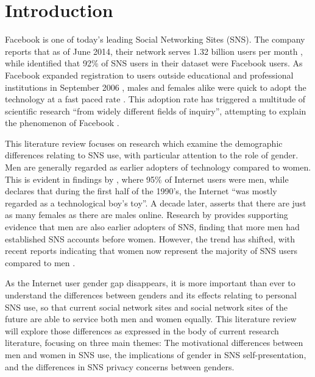 \section{Introduction}

Facebook is one of today's leading Social Networking Sites (SNS). The company reports that as of June 2014, their network serves 1.32 billion users per month \citep{Facebook2014}, while \citet{Hampton2011} identified that 92\% of SNS users in their dataset were Facebook users. As Facebook expanded registration to users outside educational and professional institutions in September 2006 \citep{Facebook2014}, males and females alike were quick to adopt the technology at a fast paced rate \citep{Mazman2011}. This adoption rate has triggered a multitude of scientific research ``from widely different fields of inquiry'', attempting to explain the phenomenon of Facebook \citep[p. 983]{Caers2013}. 

This literature review focuses on research which examine the demographic differences relating to SNS use, with particular attention to the role of gender. Men are generally regarded as earlier adopters of technology compared to women. This is evident in findings by \citet{Pitkow1994}, where 95\% of Internet users were men, while \citet[p. 896]{Kimbrough2013} declares that during the first half of the 1990's, the Internet ``was mostly regarded as a technological boy's toy''. A decade later, \citet{Fallows2005} asserts that there are just as many females as there are males online. Research by \citet{Fogel2009} provides supporting evidence that men are also earlier adopters of SNS, finding that more men had established SNS accounts before women. However, the trend has shifted, with recent reports indicating that women now represent the majority of SNS users compared to men \citep{Duggan2013, Hampton2011}.

As the Internet user gender gap disappears, it is more important than ever to understand the differences between genders and its effects relating to personal SNS use, so that current social network sites and social network sites of the future are able to service both men and women equally. This literature review will explore those differences as expressed in the body of current research literature, focusing on three main themes: The motivational differences between men and women in SNS use, the implications of gender in SNS self-presentation, and the differences in SNS privacy concerns between genders.